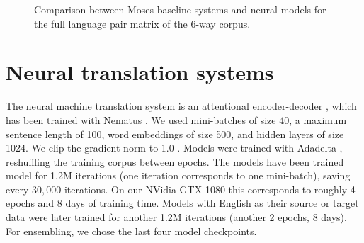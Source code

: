 \documentclass[11pt]{article}
\begin{document}
\begin{figure*}[p]
\centering
{}
\caption{Comparison between Moses baseline systems and neural models for the full language pair matrix of the 6-way corpus.}\label{pbsmtnmt1}
\end{figure*}

\section{Neural translation systems}

The neural machine translation system is an attentional encoder-decoder \cite{DBLP:journals/corr/BahdanauCB14}, which has been trained with Nematus  \cite{DBLP:conf/wmt/SennrichHB16}.
We used mini-batches of size 40, a maximum sentence length of 100, word embeddings of size 500, and hidden layers of size 1024.
We clip the gradient norm to 1.0 \cite{DBLP:conf/icml/PascanuMB13}.
Models were trained with Adadelta \cite{DBLP:journals/corr/abs-1212-5701}, reshuffling the training corpus between epochs.
The models have been trained model for 1.2M iterations (one iteration corresponds to one mini-batch), saving every $30,000$ iterations. On our NVidia GTX 1080 this corresponds to roughly 4 epochs and 8 days of training time. Models with English as their source or target data were later trained for another 1.2M iterations (another 2 epochs, 8 days). For ensembling, we chose the last four model checkpoints.
\end{document}

